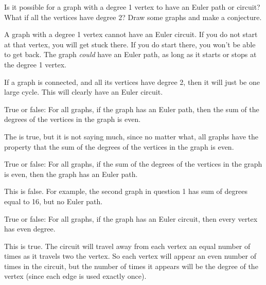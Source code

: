 \documentclass[11pt]{exam}
\begin{document}
\begin{questions}
\vfill


\question Is it possible for a graph with a degree 1 vertex to have an Euler path or circuit?  What if all the vertices have degree 2?  Draw some graphs and make a conjecture.

\begin{solution}
A graph with a degree 1 vertex cannot have an Euler circuit.  If you do not start at that vertex, you will get stuck there.  If you do start there, you won't be able to get back.  The graph \emph{could} have an Euler path, as long as it starts or stops at the degree 1 vertex.

If a graph is connected, and all its vertices have degree 2, then it will just be one large cycle.  This will clearly have an Euler circuit.
\end{solution}

\vfill

\vfill
\vfill


\newpage


\question True or false: For all graphs, if the graph has an Euler path, then the sum of the degrees of the vertices in the graph is even.

\begin{solution}
  The is true, but it is not saying much, since no matter what, all graphs have the property that the sum of the degrees of the vertices in the graph is even.
\end{solution}

\vfill

\question True or false: For all graphs, if the sum of the degrees of the vertices in the graph is even, then the graph has an Euler path.

\begin{solution}
  This is false.  For example, the second graph in question 1 has sum of degrees equal to 16, but no Euler path.
\end{solution}

\vfill

\question True or false: For all graphs, if the graph has an Euler circuit, then every vertex has even degree.

\begin{solution}
  This is true.  The circuit will travel away from each vertex an equal number of times as it travels two the vertex.  So each vertex will appear an even number of times in the circuit, but the number of times it appears will be the degree of the vertex (since each edge is used exactly once).
\end{solution}


\end{questions}
\end{document}
